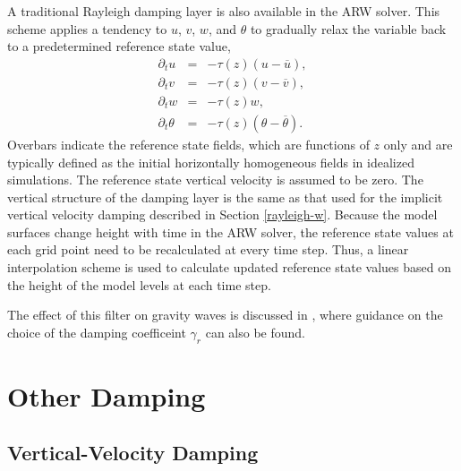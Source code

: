 A traditional Rayleigh damping layer is also available in the ARW solver.  This
scheme applies a tendency to $u$, $v$, $w$, and $\theta$ to gradually
relax the variable back to a predetermined reference state value,
%
\begin{eqnarray*}
   {\partial_t u        } & = & -\tau (z) \left( u - \overline{u} \right) ,\\
   {\partial_t v        } & = & -\tau (z) \left( v - \overline{v} \right) ,\\
   {\partial_t w       } & = & -\tau (z)        w                        ,\\
   {\partial_t \theta} & = & -\tau (z) \left( \theta - \overline{\theta} \right).
\end{eqnarray*}
%
Overbars indicate the reference state fields, which are functions of $z$
only and are typically defined as the initial horizontally homogeneous
fields in idealized simulations.  The reference state vertical velocity
is assumed to be zero.  The vertical structure of the damping layer is
the same as that used for the implicit vertical velocity damping
described in Section \ref{rayleigh-w}.
Because the model surfaces change height with time in the ARW solver, the
reference state values at each grid point need to be recalculated at
every time step.  Thus, a linear interpolation scheme is used to
calculate updated reference state values based on the height of the
model levels at each time step.

The effect of this filter on gravity waves is discussed in
\citet{klemp_and_lilly78}, where guidance on the choice of 
the damping coefficeint $\gamma_r$ can also be found.

\section{Other Damping}

\subsection{Vertical-Velocity Damping}

